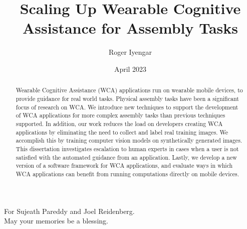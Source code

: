 \documentclass[12pt]{cmuthesis}
\begin{document}
\frontmatter

\title{{\bf Scaling Up Wearable Cognitive Assistance for Assembly Tasks}}
\author{Roger Iyengar}
\date{April 2023}

\vspace{3cm}






\maketitle

\begin{dedication}
  For Sujeath Pareddy and Joel Reidenberg.\\
  May your memories be a blessing.
\end{dedication}

\begin{abstract}
  Wearable Cognitive Assistance (WCA) applications run on wearable mobile
  devices, to provide guidance for real world tasks.
  Physical assembly tasks have been a significant focus of research on WCA.
  We introduce new techniques to support the development of WCA applications for
  more complex assembly tasks than previous techniques supported.
  In addition, our work reduces the load on developers creating WCA applications
  by eliminating the need to collect and label real training images.
  We accomplish this by training computer vision models on synthetically
  generated images.
  This dissertation investigates escalation to human experts in cases when a
  user is not satisfied with the automated guidance from an application.
  Lastly, we develop a new version of a software framework for WCA
  applications, and evaluate ways in which WCA applications can benefit from
  running computations directly on mobile devices.
\end{abstract}
\end{document}
